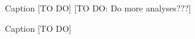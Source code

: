 
\begin{figure}
\caption{Caption [TO DO] [TO DO: Do more analyses???]}
\label{fig:MW14vsKKS2SphFlex}
\end{figure}

\begin{figure}
\caption{Caption [TO DO]}
\label{fig:MW14vsKKS2SphFlex_violins}
\end{figure}






